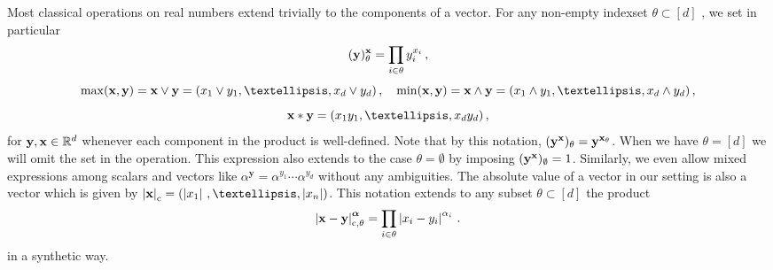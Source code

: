 \documentclass[12pt]{article}
\numberwithin{equation}{section}
\theoremstyle{plain}
\theoremstyle{definition}
\newcommand{\abs}[1]{\left\vert #1 \right\vert}
\newcommand{\R}{\ensuremath{{\mathbb R}}}
\def\fy{\mathbf y}\def\fz{\mathbf z}
\def\falpha{{\boldsymbol\alpha}}
\begin{document}
Most classical operations on real numbers extend trivially  to the components of a vector. For any non-empty indexset $\theta\subset [d]$ , we set in particular 
\[   (\fy)^{\fx}_\theta = \prod_{i\in \theta} y_i^{x_i} \,, %
\]
\[   \max(\fx, \fy)=\fx\vee\fy = (x_1\vee y_1,\dots, x_d\vee y_d)\,, \quad \min (\fx, \fy)=  \fx\wedge\fy= (x_1\wedge y_1,\dots, x_d\wedge y_d)\,,\]
\[
\fx * \fy = (x_1 y_1,\dots, x_d y_d)\,,
\]
 for $\fy,\fx\in\R^d$ whenever each component in the product is well-defined. Note that by this notation, $(\fy^\fx)_\theta = \fy^{\fx_\theta}$. When we have $\theta= [d]$ we will omit the set in the operation. This expression also extends to the case $\theta= \emptyset$ by imposing $(\fy^\fx)_\emptyset=1$. Similarly, we even allow mixed expressions among scalars and vectors like $\alpha^{\fy} =\alpha^{y_1}\cdots \alpha^{y_d}$ without any ambiguities. The absolute value of a vector in our setting is also a vector which is given by $\abs{\fx}_{\text{c}} = (\abs{x_1}\,, \ldots,  \abs{x_n})$. This notation extends to any subset $\theta \subset [d]$ the product
\begin{equation*}
    \abs{\fx-\fy}^{\falpha}_{\text{c},\theta} = \prod_{i\in \theta}\abs{x_i-y_i}^{\alpha_i}\,.
\end{equation*}
in a synthetic way.

\end{document}
